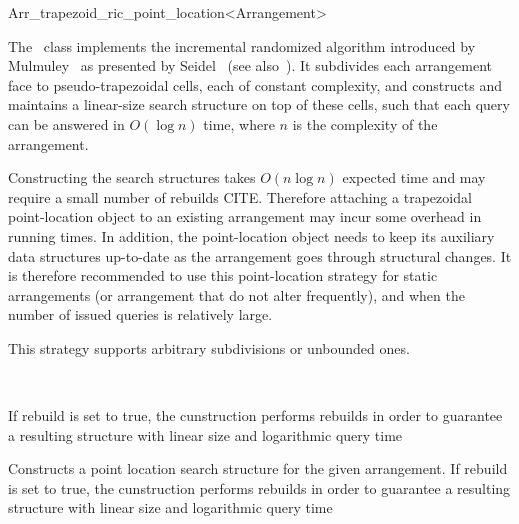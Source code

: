 
\ccRefPageBegin

\begin{ccRefClass}{Arr_trapezoid_ric_point_location<Arrangement>}
\label{arr_ref:trap_pl}

\ccDefinition

The \ccRefName\ class implements the incremental randomized algorithm
introduced by Mulmuley~\cite{m-fppa-90} as presented by
Seidel~\cite{s-sfira-91} (see also~\cite[Chapter~6]{bkos-cgaa-00}).
It subdivides each arrangement face to pseudo-trapezoidal cells, each
of constant complexity, and constructs and maintains a linear-size search
structure on top of these cells, such that each query can be answered
in $O(\log n)$ time, where $n$ is the complexity of the arrangement.

Constructing the search structures takes $O(n \log n)$ expected time 
and may require a small number of rebuilds CITE. Therefore
attaching a trapezoidal point-location object to an existing arrangement
may incur some overhead in running times. In addition, the point-location
object needs to keep its auxiliary data structures up-to-date as the
arrangement goes through structural changes. It is therefore recommended
to use this point-location strategy for static arrangements (or arrangement
that do not alter frequently), and when the number of issued queries
is relatively large.

This strategy supports arbitrary subdivisions or unbounded ones.


\ccIsModel
   \\

\ccCreation
{}

    {If rebuild is set to true, the cunstruction performs rebuilds in order to guarantee a resulting structure with linear size and logarithmic query time}

    {Constructs a point location search structure for the given arrangement. If rebuild is set to true, the cunstruction performs rebuilds in order to guarantee a resulting structure with linear size and logarithmic query time}


\end{ccRefClass}
